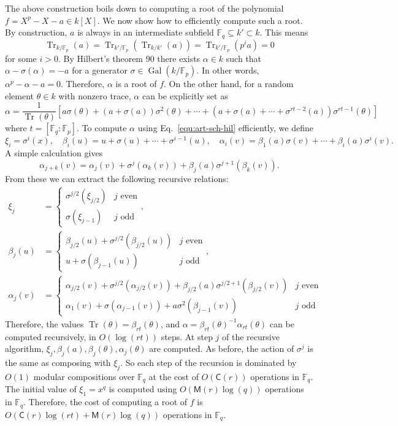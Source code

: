 \documentclass[12pt]{article}
\theoremstyle{plain}
\theoremstyle{definition}
\DeclareMathOperator{\trace}{Tr} %
\DeclareMathOperator{\gal}{Gal} %
\def\F{\ensuremath{\mathbb{F}}}
\def\MM{\ensuremath{\mathsf{M}}}
\def\CC{\ensuremath{\mathsf{C}}}
\newcounter{algorithm}
\begin{document}
The above construction boils down to computing a root of the polynomial $f = X^p - X - a \in k[X]$.
We now show how to efficiently compute such a root.
By construction, $a$ is always in an intermediate subfield 
$\F_q \subseteq k' \subset k$. This means 
\[ \trace_{k / \F_p}(a) = \trace_{k' / \F_p}(\trace_{k / k'}(a)) = \trace_{k' / \F_p}(p^ia) = 0  \]
for some $i > 0$. By Hilbert's theorem 90 there exists $\alpha \in k$ such that $\alpha - 
\sigma(\alpha) = -a$ for a generator $\sigma \in \gal(k / \F_p)$. In other words, $\alpha^p - 
\alpha - a = 0$. Therefore, $\alpha$ is a root of $f$. On the other hand, for a random element 
$\theta \in k$ with nonzero trace, $\alpha$ can be explicitly set as
\begin{equation}
	\label{equ:art-sch-hil}
	\alpha = \frac{1}{\trace(\theta)}[a\sigma(\theta) + (a + \sigma(a))\sigma^2(\theta) + \cdots + 
	(a + \sigma(a) + \cdots + \sigma^{rt - 2}(a))\sigma^{rt - 1}(\theta)]
\end{equation}
where $t = [\F_q : \F_p]$.
To compute $\alpha$ using Eq.~\eqref{equ:art-sch-hil} efficiently, we define
\[ \xi_i = \sigma^i(x), \quad \beta_i(u) = u + \sigma(u) + \cdots + \sigma^{i - 1}(u), \quad 
\alpha_i(v) = \beta_1(a)\sigma(v) + \cdots + \beta_i(a)\sigma^i(v). \]
A simple calculation gives
\[ \alpha_{j + k}(v) = \alpha_j(v) + \sigma^j(\alpha_k(v)) + \beta_j(a)\sigma^{j + 1}(\beta_k(v)). 
\]
From these we can extract the following recursive relations:
\[
\begin{aligned}
	\xi_j & = 
	\begin{cases}
		\sigma^{j / 2}(\xi_{j / 2}) & j \text{ even} \\
		\sigma(\xi_{j - 1}) & j \text{ odd}
	\end{cases}, \\
	\beta_j(u) & = 
	\begin{cases}
		\beta_{j / 2}(u) + \sigma^{j / 2}(\beta_{j / 2}(u)) & j \text{ even} \\
		u + \sigma(\beta_{j - 1}(u)) & j \text{ odd}
	\end{cases}, \\
	\alpha_{j}(v) & = 
	\begin{cases}
		\alpha_{j / 2}(v) + \sigma^{j / 2}(\alpha_{j / 2}(v)) + \beta_{j / 2}(a)\sigma^{j / 2 + 
		1}(\beta_{j / 2}(v)) & j \text{ even} \\
		\alpha_1(v) + \sigma(\alpha_{j - 1}(v)) + a\sigma^2(\beta_{j - 1}(v)) & j \text{ odd} 
	\end{cases}
\end{aligned}
\]
Therefore, the values $\trace(\theta) = \beta_{rt}(\theta)$, and $\alpha = 
\beta_{rt}(\theta)^{-1}\alpha_{rt}(\theta)$ can be computed recursively, in $O(\log(rt))$ steps. At 
step $j$ of the recursive algorithm, $\xi_j, \beta_j(a), \beta_j(\theta), \alpha_j(\theta)$ are 
computed. As before, the action of $\sigma^j$ is the same as composing with $\xi_j$. So each step 
of the recursion is dominated by $O(1)$ modular compositions over $\F_q$ at the cost of $O(\CC(r))$ 
operations in $\F_q$. The initial value of $\xi_1 = x^q$ is computed using $O(\MM(r)\log(q))$ 
operations in $\F_q$. Therefore, the cost of computing a root of $f$ is $O(\CC(r)\log(rt) + 
\MM(r)\log(q))$ operations in $\F_q$.
\end{document}
